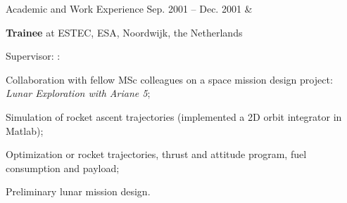 \documentclass[a4paper,12pt]{article}
\newcommand{\dynhref}[2]{%
  \iftoggle{expliciturl}{%
    #2 \footnote{\href{http://#1}{\detokenize{#1}}}%
  }{%
    \href{http://#1}{#2}%
  }%
}
\newcommand{\teachingcv}[2]{\iftoggle{teaching}{#1}{#2}}
\begin{document}
\begin{cvsection}{Academic and Work Experience}
Sep. 2001 -- Dec. 2001 &
  \begin{itti}
    \item \textbf{Trainee} at \acf{ESTEC}, \ac{ESA}, Noordwijk, the Netherlands
    \item Supervisor: \dynhref{en.wikipedia.org/wiki/Wubbo_Ockels}{Prof. Wubbo Ockels}:
    \begin{ittib}
      \item Collaboration with fellow MSc colleagues on a space mission design project: \emph{Lunar Exploration with Ariane 5};
      \item Simulation of rocket ascent trajectories (implemented a 2D orbit integrator in Matlab);
      \item Optimization or rocket trajectories, thrust and attitude program, fuel consumption and payload;
      \item Preliminary lunar mission design.
    \end{ittib}
  \end{itti}\\

\end{cvsection}

\teachingcv{
\begin{cvtext}{Teaching Experience}

At TU Delft, I was required to supervise student projects of a practical nature, every year.
This means that I had to direct the work of a small group of students (7 to 9) to a particular objective.
It is an activity I enjoy doing and I see the students are enthusiastic about.
I always ask them to fill (anonymously) a short list of questions regarding their opinion of the project and my ability as instructor (these answer sheets are available if requested).
I always get encouraging and positive feedback.

My senior colleagues always grade my teaching activities as very good to excellent and I am often asked by students to support their application with recommendation letters.

In what concerns teaching large groups of students, I have given lectures to classes of about 30 students, on exceptional occasions, at the request of colleagues.

Additionally, I was a lecturer at the 2017 Summer School On Data Assimilation And Its Applications In Oceanography, Hydrology, Risk \& Safety And Reservoir Engineering (cf. \dynhref{data-assimilation.com}{data-assimilation.com}).

I value all teaching my experiences because they were extremely rewarding.

\end{cvtext}
}{}
\end{document}
